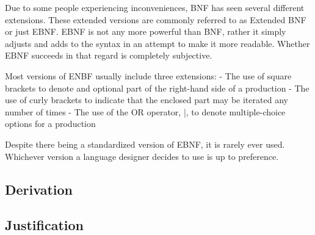 Due to some people experiencing inconveniences, BNF has seen several different extensions.
These extended versions are commonly referred to as Extended BNF or just EBNF. 
EBNF is not any more powerful than BNF, rather it simply adjusts and adds to the syntax in an attempt to make it more readable.
Whether EBNF succeeds in that regard is completely subjective. 

Most versions of ENBF usually include three extensions:
- The use of square brackets to denote and optional part of the right-hand side of a production
- The use of curly brackets to indicate that the enclosed part may be iterated any number of times
- The use of the OR operator, |, to denote multiple-choice options for a production

Despite there being a standardized version of EBNF, it is rarely ever used. 
Whichever version a language designer decides to use is up to preference.

\subsection{Derivation}


\subsection{Justification}

